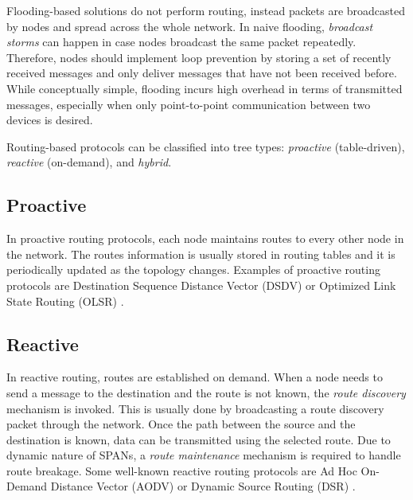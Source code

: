 \documentclass[conference,compsoc]{IEEEtran}
\begin{document}
Flooding-based solutions do not perform routing, instead packets are broadcasted by nodes and spread across the whole network. In naive flooding, \textit{broadcast storms} can happen in case nodes broadcast the same packet repeatedly. Therefore, nodes should implement loop prevention by storing a set of recently received messages and only deliver messages that have not been received before. \cite{flooding} While conceptually simple, flooding incurs high overhead in terms of transmitted messages, especially when only point-to-point communication between two devices is desired.

Routing-based protocols can be classified into tree types: \textit{proactive} (table-driven), \textit{reactive} (on-demand), and \textit{hybrid}.

\subsection{Proactive}

In proactive routing protocols, each node maintains routes to every other node in the network. The routes information is usually stored in routing tables and it is periodically updated as the topology changes. \cite{routing} Examples of proactive routing protocols are Destination Sequence Distance Vector (DSDV) \cite{dsdv} or Optimized Link State Routing (OLSR) \cite{olsr}.

\subsection{Reactive}

In reactive routing, routes are established on demand. When a node needs to send a message to the destination and the route is not known, the \textit{route discovery} mechanism is invoked. This is usually done by broadcasting a route discovery packet through the network. Once the path between the source and the destination is known, data can be transmitted using the selected route. Due to dynamic nature of SPANs, a \textit{route maintenance} mechanism is required to handle route breakage. 
Some well-known reactive routing protocols are Ad Hoc On-Demand Distance Vector (AODV) \cite{aodv} or Dynamic Source Routing (DSR) \cite{dsr}.

\end{document}
